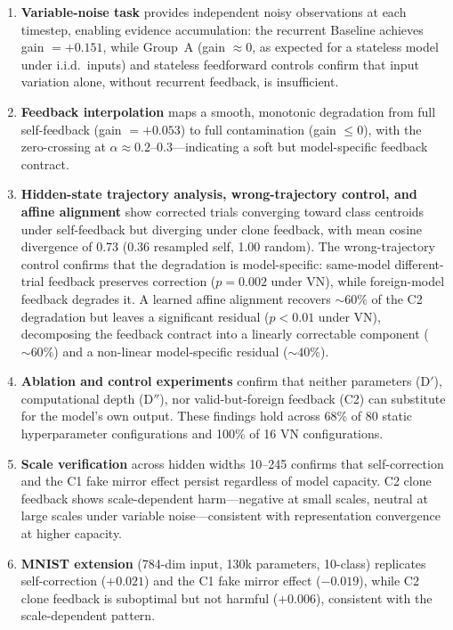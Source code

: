 \documentclass[10pt]{article}
\begin{document}
\begin{enumerate}

\item \textbf{Variable-noise task} provides independent noisy observations at each timestep, enabling evidence accumulation: the recurrent Baseline achieves gain $= +0.151$, while Group~A (gain $\approx 0$, as expected for a stateless model under i.i.d.\ inputs) and stateless feedforward controls confirm that input variation alone, without recurrent feedback, is insufficient.

\item \textbf{Feedback interpolation} maps a smooth, monotonic degradation from full self-feedback (gain $= +0.053$) to full contamination (gain $\leq 0$), with the zero-crossing at $\alpha \approx 0.2$--$0.3$---indicating a soft but model-specific feedback contract.

\item \textbf{Hidden-state trajectory analysis, wrong-trajectory control, and affine alignment} show corrected trials converging toward class centroids under self-feedback but diverging under clone feedback, with mean cosine divergence of 0.73 (0.36 resampled self, 1.00 random). The wrong-trajectory control confirms that the degradation is model-specific: same-model different-trial feedback preserves correction ($p = 0.002$ under VN), while foreign-model feedback degrades it. A learned affine alignment recovers ${\sim}60\%$ of the C2 degradation but leaves a significant residual ($p < 0.01$ under VN), decomposing the feedback contract into a linearly correctable component (${\sim}60\%$) and a non-linear model-specific residual (${\sim}40\%$).

\item \textbf{Ablation and control experiments} confirm that neither parameters (D$'$), computational depth (D$''$), nor valid-but-foreign feedback (C2) can substitute for the model's own output. These findings hold across 68\% of 80 static hyperparameter configurations and 100\% of 16 VN configurations.

\item \textbf{Scale verification} across hidden widths 10--245 confirms that self-correction and the C1 fake mirror effect persist regardless of model capacity. C2 clone feedback shows scale-dependent harm---negative at small scales, neutral at large scales under variable noise---consistent with representation convergence at higher capacity.

\item \textbf{MNIST extension} (784-dim input, 130k parameters, 10-class) replicates self-correction ($+0.021$) and the C1 fake mirror effect ($-0.019$), while C2 clone feedback is suboptimal but not harmful ($+0.006$), consistent with the scale-dependent pattern.

\end{enumerate}
\end{document}
